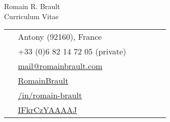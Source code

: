 \documentclass[10pt]{article} %
\begin{document}
\begin{paracol}{2} %
%
%
\parbox[top][0.12\textheight][c]{\linewidth}{ %
    \vspace{-0.04\textheight} %
    \centering %
    {\sffamily\Huge Romain R. Brault}\\\medskip %
    {\Huge\color{headings}\cvtextfont Curriculum Vitae}
}
\switchcolumn %
%
%
\parbox[top][0.12\textheight][c]{\linewidth}{ %
    \vspace{-0.04\textheight} %
    \colorbox{shade}{ %
        \begin{supertabular}{p{0.05\linewidth}|p{0.775\linewidth}} %
            \raisebox{-1pt}{\faHome} &
                Antony (92160),
                France\\ %
            \raisebox{-1pt}{\faPhone} & +33 (0)6 82 14 72 05 (private) \\
            \raisebox{0pt}{\small\faEnvelope} &
                \href{mailto:mail@romainbrault.com}{ %
                      mail@romainbrault.com} \\ %
            \raisebox{-1pt}{\faGithub} &
                \href{https://github.com/RomainBrault}{ %
                      RomainBrault} \\ %
            \raisebox{-1pt}{\faLinkedinSquare} &
                \href{https://www.linkedin.com/in/romain-brault}{ %
                      /in/romain-brault} \\ %
            \raisebox{-1pt}{\faGraduationCap} &
                \href{https://scholar.google.fr/citations?user=IFkrCzYAAAAJ}{ %
                IFkrCzYAAAAJ} \\
        \end{supertabular}
    }
}
\end{paracol}
\end{document}
